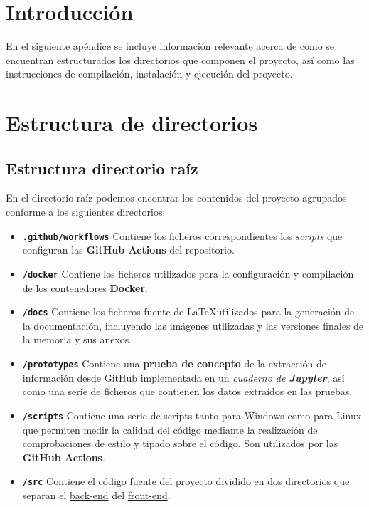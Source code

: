 
\section{Introducción}

En el siguiente apéndice se incluye información relevante acerca de como se encuentran estructurados los directorios que componen el proyecto, así como las instrucciones de compilación, instalación y ejecución del proyecto.

\section{Estructura de directorios}

\subsection{Estructura directorio raíz}

En el directorio raíz podemos encontrar los contenidos del proyecto agrupados conforme a los siguientes directorios:

\begin{itemize} [\textbullet]
    \item \textbf{\texttt{.github/workflows}} Contiene los ficheros correspondientes los \emph{scripts} que configuran las \textbf{GitHub Actions} del repositorio.
    \item \textbf{\texttt{/docker}} Contiene los ficheros utilizados para la configuración y compilación de los contenedores \textbf{Docker}.
    \item \textbf{\texttt{/docs}} Contiene los ficheros fuente de \LaTeX utilizados para la generación de la documentación, incluyendo las imágenes utilizadas y las versiones finales de la memoria y sus anexos.
    \item \textbf{\texttt{/prototypes}} Contiene una \textbf{prueba de concepto} de la extracción de información desde GitHub implementada en un \emph{cuaderno de \textbf{Jupyter}}, así como una serie de ficheros que contienen los datos extraídos en las pruebas.
    \item \textbf{\texttt{/scripts}} Contiene una serie de scripts tanto para Windows como para Linux que permiten medir la calidad del código mediante la realización de comprobaciones de estilo y tipado sobre el código. Son utilizados por las \textbf{GitHub Actions}.
    \item \textbf{\texttt{/src}} Contiene el código fuente del proyecto dividido en dos directorios que separan el \hyperref[mp:backend]{back-end} del \hyperref[mp:front-end]{front-end}.
\end{itemize}

